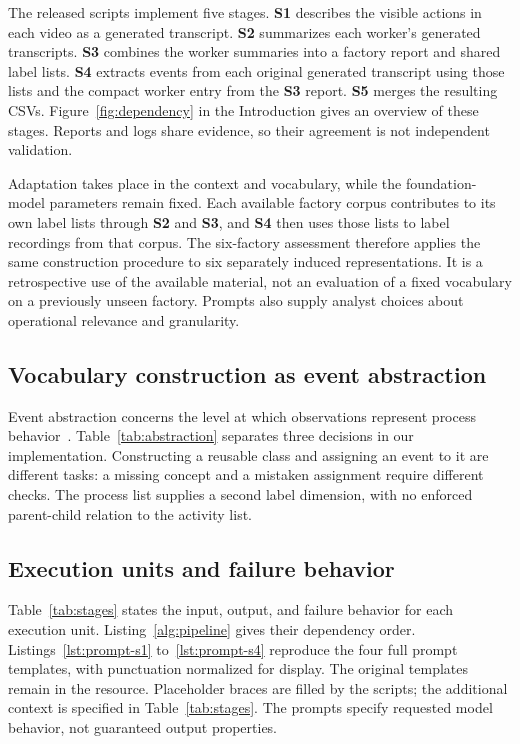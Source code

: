 The released scripts implement five stages. \textbf{S1} describes the visible actions in each video as a generated transcript. \textbf{S2} summarizes each worker's generated transcripts. \textbf{S3} combines the worker summaries into a factory report and shared label lists. \textbf{S4} extracts events from each original generated transcript using those lists and the compact worker entry from the \textbf{S3} report. \textbf{S5} merges the resulting CSVs. Figure~\ref{fig:dependency} in the Introduction gives an overview of these stages. Reports and logs share evidence, so their agreement is not independent validation.

Adaptation takes place in the context and vocabulary, while the foundation-model parameters remain fixed. Each available factory corpus contributes to its own label lists through \textbf{S2} and \textbf{S3}, and \textbf{S4} then uses those lists to label recordings from that corpus. The six-factory assessment therefore applies the same construction procedure to six separately induced representations. It is a retrospective use of the available material, not an evaluation of a fixed vocabulary on a previously unseen factory. Prompts also supply analyst choices about operational relevance and granularity.

\subsection{Vocabulary construction as event abstraction}
\label{sec:abstraction}
Event abstraction concerns the level at which observations represent process behavior~\cite{vanZelst2021abstraction}. Table~\ref{tab:abstraction} separates three decisions in our implementation. Constructing a reusable class and assigning an event to it are different tasks: a missing concept and a mistaken assignment require different checks. The process list supplies a second label dimension, with no enforced parent-child relation to the activity list.

\subsection{Execution units and failure behavior}
Table~\ref{tab:stages} states the input, output, and failure behavior for each execution unit. Listing~\ref{alg:pipeline} gives their dependency order. Listings~\ref{lst:prompt-s1} to~\ref{lst:prompt-s4} reproduce the four full prompt templates, with punctuation normalized for display. The original templates remain in the resource. Placeholder braces are filled by the scripts; the additional context is specified in Table~\ref{tab:stages}. The prompts specify requested model behavior, not guaranteed output properties.

